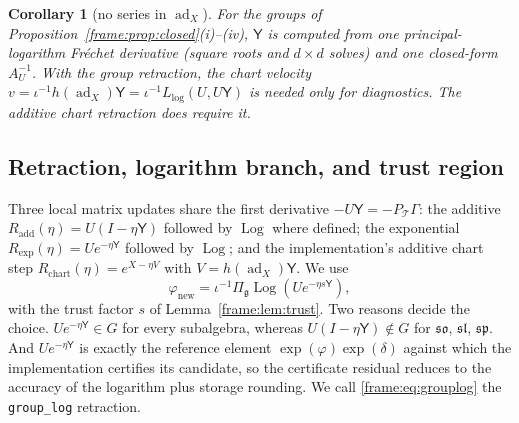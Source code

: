 \documentclass[11pt]{article}
\newtheorem{corollary}[theorem]{Corollary}
\theoremstyle{definition}
\theoremstyle{remark}
\providecommand{\ad}{\operatorname{ad}}
\providecommand{\g}{\mathfrak{g}}
\providecommand{\Log}{\operatorname{Log}}
\begin{document}
\begin{corollary}[no series in $\ad_X$]\label{frame:cor:nodexp}
For the groups of Proposition~\ref{frame:prop:closed}(i)--(iv), $\mathsf{Y}$ is computed from one principal-logarithm Fr\'echet derivative (square roots and $d\times d$ solves) and one closed-form $A_U^{-1}$. With the group retraction, the chart velocity $v=\iota^{-1}h(\ad_X)\mathsf{Y}=\iota^{-1}L_{\log}(U,U\mathsf{Y})$ is needed only for diagnostics. The additive chart retraction does require it.
\end{corollary}

\subsection{Retraction, logarithm branch, and trust region}\label{frame:sec:retraction}

Three local matrix updates share the first derivative $-U\mathsf{Y}=-P_\mathcal{T}\Gamma$: the additive $R_{\mathrm{add}}(\eta)=U(I-\eta\mathsf{Y})$ followed by $\Log$ where defined; the exponential $R_{\exp}(\eta)=Ue^{-\eta\mathsf{Y}}$ followed by $\Log$; and the implementation's additive chart step $R_{\mathrm{chart}}(\eta)=e^{X-\eta V}$ with $V=h(\ad_X)\mathsf{Y}$. We use
\begin{equation}\label{frame:eq:grouplog}
\varphi_{\mathrm{new}}=\iota^{-1}\Pi_\g\Log\left(Ue^{-\eta s\mathsf{Y}}\right),
\end{equation}
with the trust factor $s$ of Lemma~\ref{frame:lem:trust}. Two reasons decide the choice. $Ue^{-\eta\mathsf{Y}}\in G$ for every subalgebra, whereas $U(I-\eta\mathsf{Y})\notin G$ for $\mathfrak{so}$, $\mathfrak{sl}$, $\mathfrak{sp}$. And $Ue^{-\eta\mathsf{Y}}$ is exactly the reference element $\exp(\varphi)\exp(\delta)$ against which the implementation certifies its candidate, so the certificate residual reduces to the accuracy of the logarithm plus storage rounding. We call \eqref{frame:eq:grouplog} the \texttt{group\_log} retraction.
\end{document}
